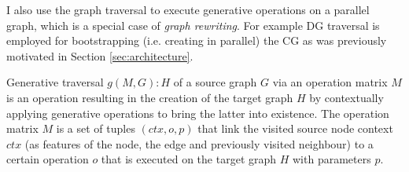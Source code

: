     I also use the graph traversal to execute generative operations on a parallel graph, which is a special case of \textit{graph rewriting}. For example DG traversal is employed for bootstrapping (i.e. creating in parallel) the CG as was previously motivated in Section \ref{sec:architecture}.

    \begin{definition}\label{def:generative-traversal}
        Generative traversal $g(M,G):H$ of a source graph $G$ via an operation matrix $M$ is an operation resulting in the creation of the target graph $H$ by contextually applying generative operations to bring the latter into existence. The operation matrix $M$ is a set of tuples $(ctx,o,p)$ that link the visited source node context $ctx$ (as features of the node, the edge and previously visited neighbour) to a certain operation $o$ that is executed on the target graph $H$ with parameters $p$.
    \end{definition}

    
